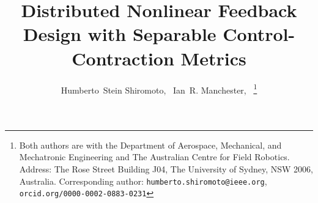 \documentclass[10pt,twocolumn,twoside]{IEEEtran}
\newcounter{para}
\theoremstyle{plain}
\theoremstyle{definition}
\theoremstyle{remark}
\begin{document}
%
\title{Distributed Nonlinear Feedback Design with Separable Control-Contraction Metrics}
%
%
%

\author{Humberto~Stein Shiromoto,~
        Ian~R. Manchester,~%
\thanks{Both authors are with the Department of Aerospace, Mechanical, and Mechatronic Engineering and The Australian Centre for Field Robotics. Address: The
Rose Street Building J04, The University of Sydney, NSW 2006, Australia. Corresponding author: {\tt humberto.shiromoto@ieee.org}, {\tt orcid.org/0000-0002-0883-0231}}%
}

% 
%



% 
\end{document}

